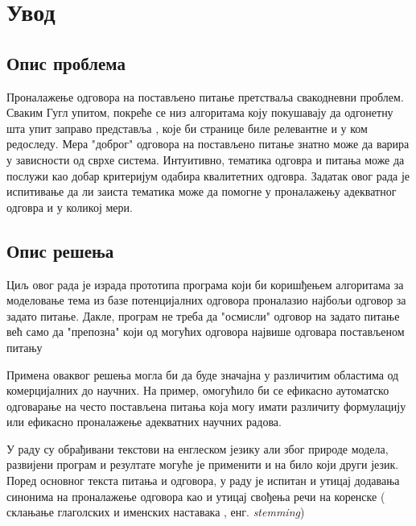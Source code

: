 \chapter{Увод}


\section{Опис проблема}

Проналажење одговора на постављено питање претстваља  свакодневни проблем. Сваким Гугл упитом, покреће се низ алгоритама коју покушавају да одгонетну шта упит заправо представља , које би странице биле релевантне и у ком редоследу. 
Мера "доброг" одговора на постављено питање знатно може да варира у зависности од сврхе система. Интуитивно, тематика одговра и питања може да послужи као добар критеријум одабира квалитетних одговра. Задатак овог рада је испитивање да ли заиста тематика може да помогне у проналажењу адекватног одговра и у коликој мери.



\section{Опис решења}


Циљ овог рада је израда прототипа програма који би коришђењем алгоритама за моделовање тема из базе потенцијалних одговора проналазио најбољи одговор за задато питање. Дакле, програм не треба да "осмисли" одговор на задато питање већ само да "препозна" који од могућих одговора највише одговара постављеном питању 

Примена оваквог решења могла би да буде значајна у различитим областима од комерцијалних до научних. На пример, омогућило би се ефикасно аутоматско одговарање на често постављена питања која могу имати различиту формулацију или ефикасно проналажење адекватних научних радова. 

У раду су обрађивани текстови на енглеском језику али због природе модела, развијени програм и резултате могуће је применити и на било који други језик. Поред основног текста питања и одговора, у раду је испитан и утицај додавања синонима на проналажење одговора као и утицај свођења речи на коренске ( склањање глаголских и именских наставака , енг. \textit{stemming})

